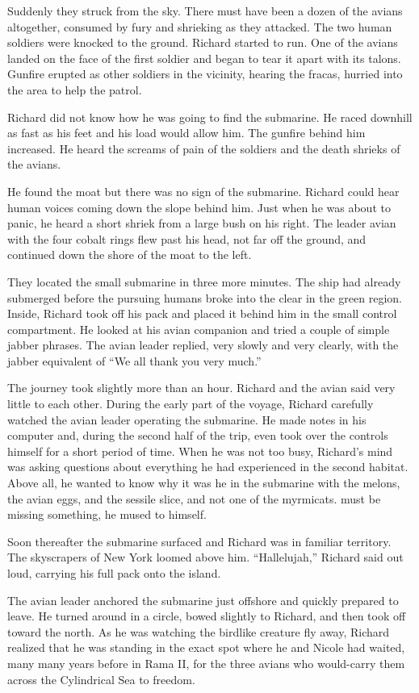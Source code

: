 \documentclass[]{article}
\begin{document}
{{Suddenly they struck from the sky.  There must have been a dozen of the avians altogether, consumed by fury and shrieking as they attacked.  The two human soldiers were knocked to the ground.  Richard started to run.  One of the avians landed on the face of the first soldier and began to tear it apart with its talons.  Gunfire erupted as other soldiers in the vicinity, hearing the fracas, hurried into the area to help the patrol.

Richard did not know how he was going to find the submarine.  He raced downhill as fast as his feet and his load would allow him.  The gunfire behind him increased.  He heard the screams of pain of the soldiers and the death shrieks of the avians.

He found the moat but there was no sign of the submarine.  Richard could hear human voices coming down the slope behind him.  Just when he was about to panic, he heard a short shriek from a large bush on his right.  The leader avian with the four cobalt rings flew past his head, not far off the ground, and continued down the shore of the moat to the left.

They located the small submarine in three more minutes.  The ship had already submerged before the pursuing humans broke into the clear in the green region.  Inside, Richard took off his pack and placed it behind him in the small control compartment.  He looked at his avian companion and tried a couple of simple jabber phrases.  The avian leader replied, very slowly and very clearly, with the jabber equivalent of “We all thank you very much.”

The journey took slightly more than an hour.  Richard and the avian said very little to each other.  During the early part of the voyage, Richard carefully watched the avian leader operating the submarine.  He made notes in his computer and, during the second half of the trip, even took over the controls himself for a short period of time.  When he was not too busy, Richard’s mind was asking questions about everything he had experienced in the second habitat.  Above all, he wanted to know why it was he in the submarine with the melons, the avian eggs, and the sessile slice, and not one of the myrmicats.  must be missing something, he mused to himself.

Soon thereafter the submarine surfaced and Richard was in familiar territory.  The skyscrapers of New York loomed above him.  “Hallelujah,” Richard said out loud, carrying his full pack onto the island.

The avian leader anchored the submarine just offshore and quickly prepared to leave.  He turned around in a circle, bowed slightly to Richard, and then took off toward the north.  As he was watching the birdlike creature fly away, Richard realized that he was standing in the exact spot where he and Nicole had waited, many many years before in Rama II, for the three avians who would-carry them across the Cylindrical Sea to freedom.


}}
\end{document}
